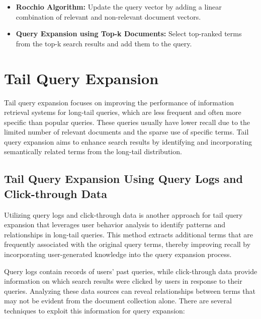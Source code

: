 \documentclass[12pt]{article}
\begin{document}
\begin{itemize}
    \item \textbf{Rocchio Algorithm:} Update the query vector by adding a linear combination of relevant and non-relevant document vectors.
    \item \textbf{Query Expansion using Top-k Documents:} Select top-ranked terms from the top-k search results and add them to the query.
\end{itemize}


\section{Tail Query Expansion}
Tail query expansion focuses on improving the performance of information retrieval systems for long-tail queries, which are less frequent and often more specific than popular queries. These queries usually have lower recall due to the limited number of relevant documents and the sparse use of specific terms. Tail query expansion aims to enhance search results by identifying and incorporating semantically related terms from the long-tail distribution.
\subsection{Tail Query Expansion Using Query Logs and Click-through Data}
Utilizing query logs and click-through data is another approach for tail query expansion that leverages user behavior analysis to identify patterns and relationships in long-tail queries. This method extracts additional terms that are frequently associated with the original query terms, thereby improving recall by incorporating user-generated knowledge into the query expansion process.

Query logs contain records of users' past queries, while click-through data provide information on which search results were clicked by users in response to their queries. Analyzing these data sources can reveal relationships between terms that may not be evident from the document collection alone. There are several techniques to exploit this information for query expansion:
\end{document}
